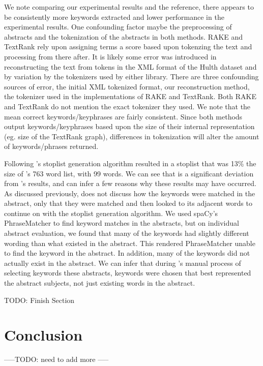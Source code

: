 \documentclass[11pt,a4paper]{article}
\begin{document}
We note comparing our experimental results and the reference, there appears to be consistently more keywords extracted and lower performance in the experimental results. One confounding factor maybe the preprocessing of abstracts and the tokenization of the abstracts in both methods. RAKE and TextRank rely upon assigning terms a score based upon tokenzing the text and processing from there after. It is likely some error was introduced in reconstructing the text from tokens in the XML format of the Hulth dataset and by variation by the tokenizers used by either library. There are three confounding sources of error, the initial XML tokenized format, our reconstruction method, the tokenizer used in the implementations of RAKE and TextRank. Both RAKE and TextRank do not mention the exact tokenizer they used. We note that the mean correct keywords/keyphrases are fairly consistent. Since both methods output keywords/keyphrases based upon the size of their internal representation (eg. size of the TextRank graph), differences in tokenization will alter the amount of keywords/phrases returned.

Following \citet{1}'s stoplist generation algorithm resulted in a stoplist that was 13\% the size of \citet{1}'s 763 word list, with 99 words. We can see that is a significant deviation from \citet{1}'s results, and can infer a few reasons why these results may have occurred. As discussed previously, \citet{1} does not discuss how the keywords were matched in the abstract, only that they were matched and then looked to its adjacent words to continue on with the stoplist generation algorithm. We used spaCy's PhraseMatcher to find keyword matches in the abstracts, but on individual abstract evaluation, we found that many of the keywords had slightly different wording than what existed in the abstract. This rendered PhraseMatcher unable to find the keyword in the abstract. In addition, many of the keywords did not actually exist in the abstract. We can infer that during \citet{hulth-2003-improved}'s manual process of selecting keywords these abstracts, keywords were chosen that best represented the abstract subjects, not just existing words in the abstract.

TODO: Finish Section

\section{Conclusion}

-----TODO: need to add more -----
\end{document}
